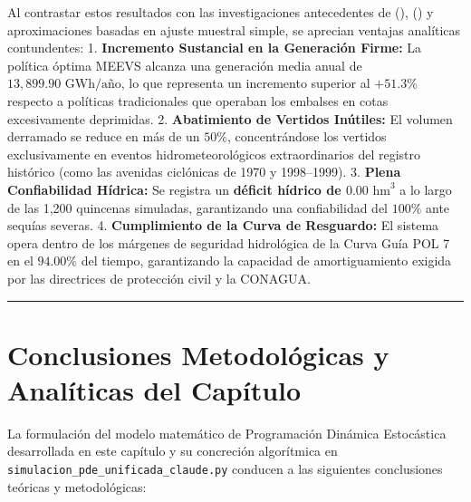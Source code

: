 \documentclass[
  spanish,
  letterpaper,
]{scrreprt}
\theoremstyle{definition}
\theoremstyle{remark}
\begin{document}
Al contrastar estos resultados con las investigaciones antecedentes de
(),
() y aproximaciones basadas
en ajuste muestral simple, se aprecian ventajas analíticas contundentes:
1. \textbf{Incremento Sustancial en la Generación Firme:} La política
óptima MEEVS alcanza una generación media anual de
\textbf{\(13,899.90\text{ GWh/año}\)}, lo que representa un incremento
superior al \textbf{\(+51.3\%\)} respecto a políticas tradicionales que
operaban los embalses en cotas excesivamente deprimidas. 2.
\textbf{Abatimiento de Vertidos Inútiles:} El volumen derramado se
reduce en más de un \textbf{\(50\%\)}, concentrándose los vertidos
exclusivamente en eventos hidrometeorológicos extraordinarios del
registro histórico (como las avenidas ciclónicas de 1970 y 1998--1999).
3. \textbf{Plena Confiabilidad Hídrica:} Se registra un \textbf{déficit
hídrico de \(0.00\text{ hm}^3\)} a lo largo de las 1,200 quincenas
simuladas, garantizando una confiabilidad del \(100\%\) ante sequías
severas. 4. \textbf{Cumplimiento de la Curva de Resguardo:} El sistema
opera dentro de los márgenes de seguridad hidrológica de la Curva Guía
POL 7 en el \textbf{\(94.00\%\)} del tiempo, garantizando la capacidad
de amortiguamiento exigida por las directrices de protección civil y la
CONAGUA.

\begin{center}\rule{0.5\linewidth}{0.5pt}\end{center}

\section{Conclusiones Metodológicas y Analíticas del
Capítulo}\label{conclusiones-metodoluxf3gicas-y-analuxedticas-del-capuxedtulo}

La formulación del modelo matemático de Programación Dinámica
Estocástica desarrollada en este capítulo y su concreción algorítmica en
\texttt{simulacion\_pde\_unificada\_claude.py} conducen a las siguientes
conclusiones teóricas y metodológicas:
\end{document}
